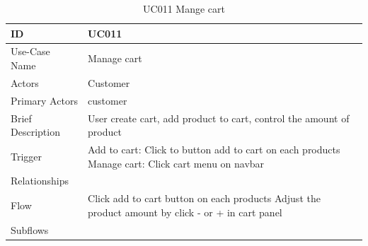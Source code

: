 \begin{table}
\begin{tabular}{|>{\raggedright\arraybackslash}p{5cm}|>{\raggedright\arraybackslash}p{10cm}|}
\hline
ID& UC011 \\
\hline
Use-Case Name& Manage cart\\
\hline
Actors& Customer \\
\hline
Primary Actors& customer \\
\hline
Brief Description& User create cart, add product to cart, control the amount of product\\
\hline
Trigger& Add to cart: Click to button add to cart on each products \break
Manage cart: Click cart menu on navbar\\
\hline
Relationships& \\
\hline
Flow& Click add to cart button on each products
Adjust the product amount by click - or + in cart panel\\
\hline
Subflows& \\
\hline
\end{tabular}
\caption{UC011 Mange cart}
\label{tab:UC011}
\end{table}

